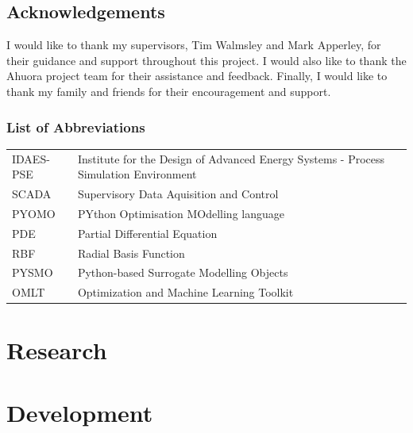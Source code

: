 \documentclass[12pt]{report}
\begin{document}
\chapter*{Acknowledgements}

I would like to thank my supervisors, Tim Walmsley and Mark Apperley, for their guidance and support throughout this project. I would also like to thank the Ahuora project team for their assistance and feedback. Finally, I would like to thank my family and friends for their encouragement and support.

\tableofcontents
\listoffigures
\listoftables

\section*{List of Abbreviations}

\begin{tabular}{lL{13cm}}
    IDAES-PSE & Institute for the Design of Advanced Energy Systems - Process Simulation Environment \\
    SCADA & Supervisory Data Aquisition and Control \\
    PYOMO & PYthon Optimisation MOdelling language \\
    PDE & Partial Differential Equation \\
    RBF & Radial Basis Function \\
    PYSMO & Python-based Surrogate Modelling Objects \\
    OMLT & Optimization and Machine Learning Toolkit \\
\end{tabular}

\newpage
{}






\part{Research}



%
\part{Development}

%


\end{document}
